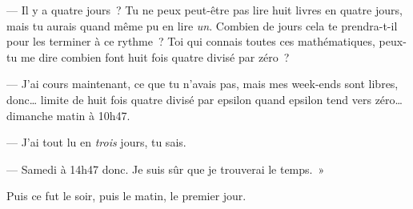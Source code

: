 --- Il y a quatre jours~?
Tu ne peux peut-être pas lire huit livres en quatre jours, mais tu aurais quand même pu en lire \emph{un}.
Combien de jours cela te prendra-t-il pour les terminer à ce rythme~?
Toi qui connais toutes ces mathématiques, peux-tu me dire combien font huit fois quatre divisé par zéro~?

--- J'ai cours maintenant, ce que tu n'avais pas, mais mes week-ends sont libres, donc… limite de huit fois quatre divisé par epsilon quand epsilon tend vers zéro… dimanche matin à 10h47.

--- J'ai tout lu en \emph{trois} jours, tu sais.

--- Samedi à 14h47 donc. Je suis sûr que je trouverai le temps.~»

Puis ce fut le soir, puis le matin, le premier jour.

